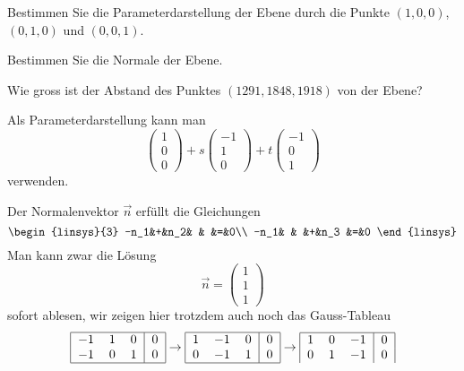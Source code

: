 \begin{teilaufgaben}
\item Bestimmen Sie die Parameterdarstellung der Ebene durch die
Punkte $(1,0,0)$, $(0,1,0)$ und $(0,0,1)$.
\item Bestimmen Sie die Normale der Ebene.
\item Wie gross ist der Abstand des Punktes $(1291, 1848, 1918)$ von
der Ebene?
\end{teilaufgaben}

\begin{loesung}
\begin{teilaufgaben}
\item Als Parameterdarstellung kann man
\[
\begin{pmatrix}1\\0\\0\end{pmatrix}
+s\begin{pmatrix}-1\\1\\0\end{pmatrix}
+t\begin{pmatrix}-1\\0\\1\end{pmatrix}
\]
verwenden.
\item  Der Normalenvektor $\vec n$ erfüllt die Gleichungen
\[
\begin{linsys}{3}
-n_1&+&n_2& &    &=&0\\
-n_1& &   &+&n_3 &=&0
\end{linsys}
\]
Man kann zwar die Lösung
\[
\vec n=
\begin{pmatrix}1\\1\\1\end{pmatrix}
\]
sofort ablesen, wir zeigen hier trotzdem auch noch das Gauss-Tableau
\[
\begin{tabular}{|ccc|c|}
\hline
$-1$&1&0&0\\
$-1$&0&1&0\\
\hline
\end{tabular}
\rightarrow
\begin{tabular}{|ccc|c|}
\hline
1&$-1$&0&0\\
0&$-1$&1&0\\
\hline
\end{tabular}
\rightarrow
\begin{tabular}{|ccc|c|}
\hline
1& 0&$-1$&0\\
0& 1&$-1$&0\\

\end{tabular}\]
\end{teilaufgaben}
\end{loesung}
